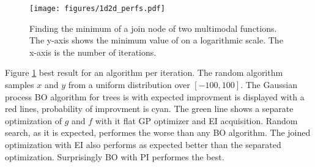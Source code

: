 \documentclass[english]{article}
\begin{document}
\begin{figure}
  \texttt{[image: figures/1d2d\_perfs.pdf]}
  \caption{Finding the minimum of a join node of two multimodal functions. The y-axis shows the minimum value of on a logarithmic scale. The x-axis is the number of iterations.}
  \label{1d2d_perfs}
\end{figure}

Figure \ref{1d2d_perfs} best result for an algorithm per iteration. The random algorithm samples $x$ and $y$ from a uniform distribution over $[-100, 100]$. The Gaussian process BO algorithm for trees is with expected improvment is displayed with a red lines, probability of improvment is cyan. The green line shows a separate optimization of $g$ and $f$ with it flat GP optimizer and EI acquisition.
Random search, as it is expected, performes the worse than any BO algorithm. The joined optimization with EI also performs as expected better than the separated optimization. Surprisingly BO with PI performes the best.



\end{document}
